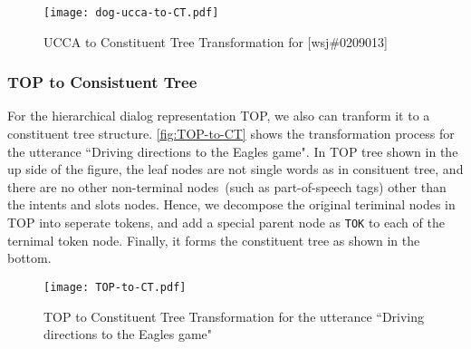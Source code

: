 \begin{figure}[!h]
\centering
\texttt{[image: dog-ucca-to-CT.pdf]}
\caption{\label{fig:ucca-to-CT} UCCA to Constituent Tree Transformation for [wsj\#0209013]}
\end{figure}

\subsubsection{TOP to Consistuent Tree}
\label{sssec:phr:top-to-ct}
For the hierarchical dialog representation TOP, we also can tranform
it to a constituent tree structure. \autoref{fig:TOP-to-CT} shows the
transformation process for the utterance ``Driving directions to the
Eagles game". In TOP tree shown in the up side of the figure, the leaf
nodes are not single words as in consituent tree, and there are no
other non-terminal nodes~(such as part-of-speech tags) other than the
intents and slots nodes. Hence, we decompose the original teriminal
nodes in TOP into seperate tokens, and add a special parent node as
\texttt{TOK} to each of the ternimal token node. Finally, it forms the
constituent tree as shown in the bottom.
\begin{figure}[!h]
\centering
\texttt{[image: TOP-to-CT.pdf]}
\caption{\label{fig:TOP-to-CT} TOP to Constituent Tree Transformation
  for the utterance ``Driving directions to the Eagles game"}
\end{figure}

